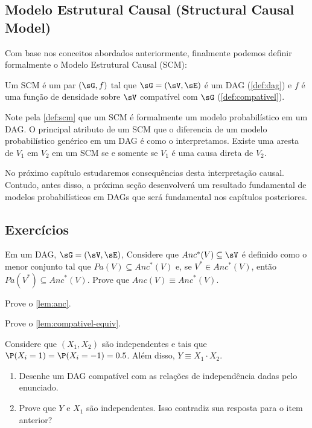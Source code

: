 \subsection{Modelo Estrutural Causal (Structural Causal Model)}

Com base nos conceitos abordados anteriormente,
finalmente podemos definir formalmente
o Modelo Estrutural Causal (SCM):

\begin{definition}
 \label{def:scm}
 Um SCM é um par $(\sG,f)$ tal que
 $\sG = (\sV, \sE)$ é um DAG (\cref{def:dag}) e
 $f$ é uma função de densidade sobre $\sV$
 compatível com $\sG$ (\cref{def:compativel}).
\end{definition}

Note pela \cref{def:scm} que
um SCM é formalmente um modelo probabilístico em um DAG.
O principal atributo de um SCM que 
o diferencia de um modelo probabilístico genérico em um DAG é
como o interpretamos.
Existe uma aresta de $V_1$ em $V_2$ em um SCM
se e somente se $V_1$ é uma causa direta de $V_2$.

No próximo capítulo estudaremos consequências desta interpretação causal.
Contudo, antes disso, a próxima seção desenvolverá
um resultado fundamental de modelos probabilísticos em DAGs que
será fundamental nos capítulos posteriores.

\subsection{Exercícios}

\begin{exercise}
 Em um DAG, $\sG = (\sV, \sE)$,
 Considere que $Anc^*(V) \subseteq \sV$ é
 definido como o menor conjunto tal que
 $Pa(V) \subseteq Anc^*(V)$ e, se
 $V^* \in Anc^*(V)$, então $Pa(V^*) \subseteq Anc^*(V)$.
 Prove que $Anc(V) \equiv Anc^*(V)$.
\end{exercise}

\begin{exercise} 
 Prove o \cref{lem:anc}.
\end{exercise}

\begin{exercise}
 Prove o \cref{lem:compativel-equiv}.
\end{exercise}

\begin{exercise}
 Considere que $(X_1,X_2)$ são independentes e
 tais que $\P(X_i=1)=\P(X_i=-1)=0.5$.
 Além disso, $Y \equiv X_1 \cdot X_2$.
 \begin{enumerate}[label=(\alph*)]
  \item Desenhe um DAG compatível
  com as relações de independência dadas pelo enunciado.
  \item Prove que $Y$ e $X_1$ são independentes.
  Isso contradiz sua resposta para o item anterior?
 \end{enumerate}
\end{exercise}

